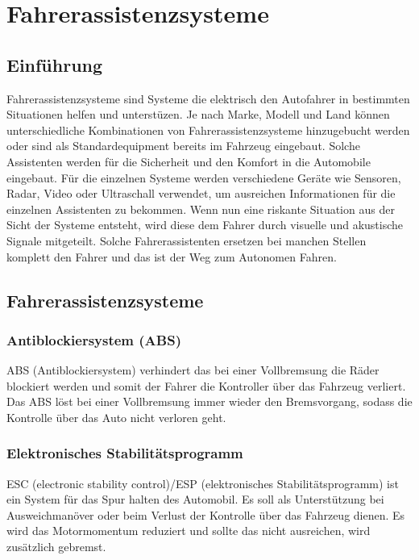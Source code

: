 \section{Fahrerassistenzsysteme}
    \subsection{Einführung}
    Fahrerassistenzsysteme sind Systeme die elektrisch den Autofahrer in bestimmten
    Situationen helfen und unterstüzen. Je nach Marke, Modell und Land können
    unterschiedliche Kombinationen von Fahrerassistenzsysteme hinzugebucht werden
    oder sind als Standardequipment bereits im Fahrzeug eingebaut. Solche Assistenten
    werden für die Sicherheit und den Komfort in die Automobile eingebaut. Für die
    einzelnen Systeme werden verschiedene Geräte wie Sensoren, Radar, Video oder
    Ultraschall verwendet, um ausreichen Informationen für die einzelnen Assistenten
    zu bekommen. Wenn nun eine riskante Situation aus der Sicht der Systeme entsteht,
    wird diese dem Fahrer durch visuelle und akustische Signale mitgeteilt. Solche
    Fahrerassistenten ersetzen bei manchen Stellen komplett den Fahrer und das ist
    der Weg zum Autonomen Fahren.
    ~\cite{assistenzsysteme.PB1} ~\cite{assistenzsysteme.PB2} ~\cite{assistenzsysteme.PB3}
    ~\cite{assistenzsysteme.PB4}
    \subsection{Fahrerassistenzsysteme}

        \subsubsection{Antiblockiersystem (ABS)}
        ABS (Antiblockiersystem) verhindert das bei einer Vollbremsung die Räder
        blockiert werden und somit der Fahrer die Kontroller über das Fahrzeug verliert.
        Das ABS löst bei einer Vollbremsung immer wieder den Bremsvorgang, sodass die 
        Kontrolle über das Auto nicht verloren geht.
        ~\cite{assistenzsysteme.PB2} ~\cite{antiblockiersys.PB1}

        \subsubsection{Elektronisches Stabilitätsprogramm}
        ESC (electronic stability control)/ESP (elektronisches Stabilitätsprogramm) ist ein System
        für das Spur halten des Automobil. Es soll als Unterstützung bei Ausweichmanöver oder beim Verlust
        der Kontrolle über das Fahrzeug dienen. Es wird das Motormomentum reduziert und sollte das nicht
        ausreichen, wird zusätzlich gebremst.
        ~\cite{assistenzsysteme.PB2} ~\cite{ESP.PB1}
        
